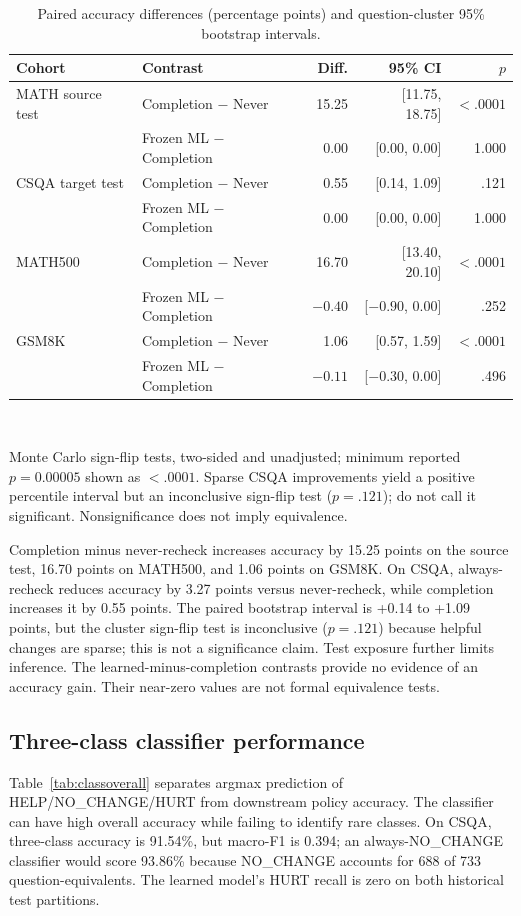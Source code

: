 \documentclass[conference]{IEEEtran}
\begin{document}
\begin{table}[t]
\caption{Paired accuracy differences (percentage points) and question-cluster 95\% bootstrap intervals.}
\label{tab:paired}
\centering\scriptsize
\begin{tabular}{llrrr}
\toprule
\textbf{Cohort} & \textbf{Contrast} & \textbf{Diff.} & \textbf{95\% CI} & \textbf{$p$}\\
\midrule
MATH source test & Completion $-$ Never & 15.25 & [11.75, 18.75] & $<.0001$\\
 & Frozen ML $-$ Completion & 0.00 & [0.00, 0.00] & 1.000\\
CSQA target test & Completion $-$ Never & 0.55 & [0.14, 1.09] & .121\\
 & Frozen ML $-$ Completion & 0.00 & [0.00, 0.00] & 1.000\\
MATH500 & Completion $-$ Never & 16.70 & [13.40, 20.10] & $<.0001$\\
 & Frozen ML $-$ Completion & $-0.40$ & [$-0.90$, 0.00] & .252\\
GSM8K & Completion $-$ Never & 1.06 & [0.57, 1.59] & $<.0001$\\
 & Frozen ML $-$ Completion & $-0.11$ & [$-0.30$, 0.00] & .496\\
\bottomrule
\end{tabular}
\\[-1pt]\parbox{\linewidth}{\scriptsize Monte Carlo sign-flip tests, two-sided and unadjusted; minimum reported $p=0.00005$ shown as $<.0001$. Sparse CSQA improvements yield a positive percentile interval but an inconclusive sign-flip test ($p=.121$); do not call it significant. Nonsignificance does not imply equivalence.}
\end{table}

Completion minus never-recheck increases accuracy by 15.25 points on the source test, 16.70 points on MATH500, and 1.06 points on GSM8K. On CSQA, always-recheck reduces accuracy by 3.27 points versus never-recheck, while completion increases it by 0.55 points. The paired bootstrap interval is +0.14 to +1.09 points, but the cluster sign-flip test is inconclusive ($p=.121$) because helpful changes are sparse; this is not a significance claim. Test exposure further limits inference. The learned-minus-completion contrasts provide no evidence of an accuracy gain. Their near-zero values are not formal equivalence tests.

\subsection{Three-class classifier performance}
Table~\ref{tab:classoverall} separates argmax prediction of HELP/NO\_CHANGE/HURT from downstream policy accuracy. The classifier can have high overall accuracy while failing to identify rare classes. On CSQA, three-class accuracy is 91.54\%, but macro-F1 is 0.394; an always-NO\_CHANGE classifier would score 93.86\% because NO\_CHANGE accounts for 688 of 733 question-equivalents. The learned model's HURT recall is zero on both historical test partitions.
\end{document}
